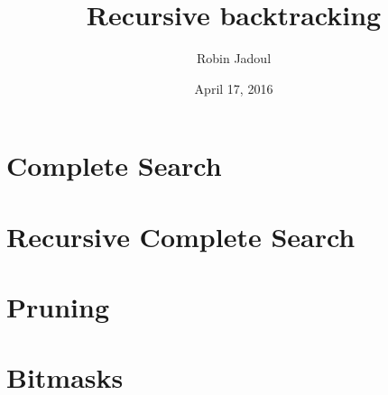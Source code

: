 \documentclass{beamer}
\title{Recursive backtracking}
\author{Robin Jadoul}
\date{April 17, 2016}
\institute
{
    \texttt{[image: ../share/beoi-logo.png]}
}
\begin{document}
\frame{\titlepage}

\section[Complete Search]{Complete Search}


\section[Recursive Complete Search]{Recursive Complete Search}


\section[Pruning]{Pruning}


\section[Bitmasks]{Bitmasks}

\end{document}
